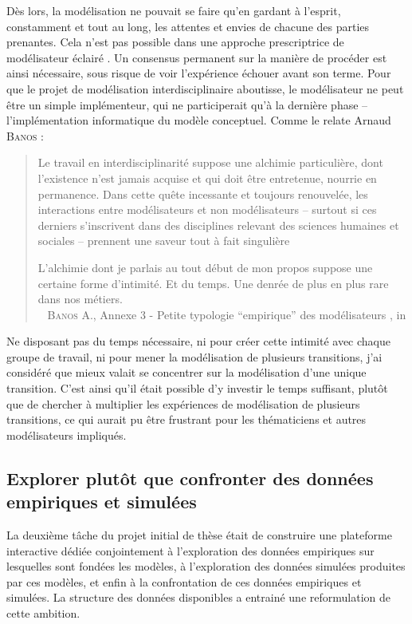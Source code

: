 Dès lors, la modélisation ne pouvait se faire qu'en gardant à l'esprit, constamment et tout au long, les attentes et envies de chacune des parties prenantes.
Cela n'est pas possible dans une approche prescriptrice de \og modélisateur éclairé\fg{} \autocite[484]{ouriachi_lelaboration_2017}.
Un consensus permanent sur la manière de procéder est ainsi nécessaire, sous risque de voir l'expérience échouer avant son terme.
Pour que le projet de modélisation interdisciplinaire aboutisse, le modélisateur ne peut être un simple \og implémenteur\fg{}, qui ne participerait qu'à la dernière phase -- l'implémentation informatique du modèle conceptuel.
Comme le relate Arnaud \textsc{Banos} :
\begin{quotation}
	\noindent \og
	Le travail en interdisciplinarité suppose une alchimie particulière, dont l'existence n'est jamais acquise et qui doit être entretenue, nourrie en permanence.
	Dans cette quête incessante et toujours renouvelée, les interactions entre modélisateurs et non modélisateurs -- surtout si ces derniers s'inscrivent dans des disciplines relevant des sciences humaines et sociales -- prennent une saveur tout à fait singulière \textelp{}
	
	\noindent L'alchimie dont je parlais au tout début de mon propos suppose une certaine forme d'intimité.
	Et du temps.
	Une denrée de plus en plus rare dans nos métiers. \fg{} \\
	\mbox{}~ \textsc{Banos} A., \og Annexe 3 - Petite typologie “empirique” des modélisateurs \fg{}, in \textcite[483,485]{ouriachi_lelaboration_2017}
\end{quotation}
Ne disposant pas du temps nécessaire, ni pour créer cette intimité avec chaque groupe de travail, ni pour mener la modélisation de plusieurs transitions, j'ai considéré que mieux valait se concentrer sur la modélisation d'une unique transition.
C'est ainsi qu'il était possible d'y investir le temps suffisant, plutôt que de chercher à multiplier les expériences de modélisation de plusieurs transitions, ce qui aurait pu être frustrant pour les thématiciens et autres modélisateurs impliqués.


\subsection{Explorer plutôt que confronter des données empiriques et simulées \label{subsec:explorer-confronter}}

La deuxième tâche du projet initial de thèse était de construire une plateforme interactive dédiée conjointement à l'exploration des données empiriques sur lesquelles sont fondées les modèles, à l'exploration des données simulées produites par ces modèles, et enfin à la confrontation de ces données empiriques et simulées.
La structure des données disponibles a entrainé une reformulation de cette ambition.

